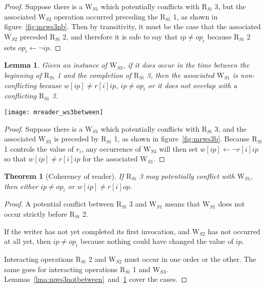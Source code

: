 \documentclass{article}
\newtheorem{thm}{Theorem}
\newtheorem{lemma}{Lemma}
\newcommand\RS[1]{\ensuremath{\text{R}_{S#1}}}
\newcommand\WS[1]{\ensuremath{\text{W}_{S#1}}}
\newcommand\W[1]{\ensuremath{w\left[#1\right]}}
\newcommand\R[1]{\ensuremath{r\left[#1\right]}}
\newcommand\ip{\ensuremath{ip}}
\newcommand\op{\ensuremath{op}}
\begin{document}
\begin{proof}
  Suppose there is a \WS1 which potentially conflicts with \RS i 3, but
  the associated \WS3 operation occurred preceding the \RS i 1, as shown
  in figure~\ref{fig:mrws3nb}. Then by transitivity, it must be the case
  that the associated \WS2 preceded \RS i 2, and therefore it is safe to
  say that $\ip\neq\op_i$ because \RS i 2 sets $\op_i\gets\neg\ip$.
\end{proof}

\begin{lemma}\label{lma:mws3between}
  Given an instance of \WS3, if it does occur in the time between the
  beginning of \RS i 1 and the completion of \RS i 3, then the associated
  \WS1 is non-conflicting because $\W{\ip}\neq\R{i}{\ip}$, $\ip\neq\op_i$
  or it does not overlap with a conflicting \RS i 3.
\end{lemma}

\begin{figure*}[h]
  \centering
  \texttt{[image: mreader\_ws3between]}
  \caption{\WS 3 occurs at least once between \RS i 1 and completion
    of \RS i 3, as well as a case where $\ip=\op_i$}
  \label{fig:mrws3b}
\end{figure*}

\begin{proof}
  Suppose there is a \WS1 which potentially conflicts with \RS i 3, and
  the associated \WS3 is preceded by \RS i 1, as shown in
  figure~\ref{fig:mrws3b}. Because \RS i 1 controls the value of $r_i$, any
  occurrence of \WS3 will then set $\W{\ip}\gets\neg\R{i}{\ip}$ so that
  $\W{\ip}\neq\R{i}{\ip}$ for the associated \WS1.
\end{proof}

\begin{thm}[Coherency of reader]\label{thm:mrcoh}
  If \RS i 3 may potentially conflict with \WS1, then either
  $\ip\neq\op_i$ or $\W{\ip}\neq\R i {\op}$.
\end{thm}
\begin{proof}
  A potential conflict between \RS i 3 and \WS1 means that \WS1 does not occur strictly before \RS i 2.

  If the writer has not yet completed its first invocation, and \WS2
  has not occurred at all yet, then $\ip\neq\op_i$ because nothing
  could have changed the value of $\ip$.

  Interacting operations \RS i 2 and \WS2 must occur in one order or
  the other. The same goes for interacting operations \RS i 1 and
  \WS3.  Lemmas~\ref{lma:mws3notbetween}~and~\ref{lma:mws3between}
  cover the cases.
\end{proof}
\end{document}
